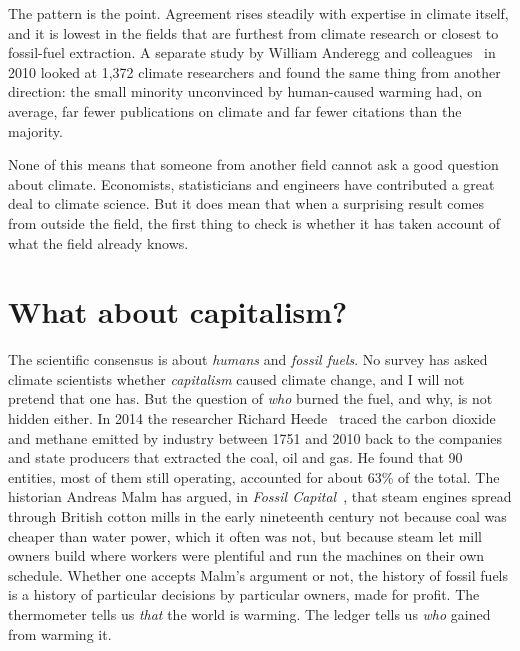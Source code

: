 The pattern is the point. Agreement rises steadily with expertise in climate itself, and it is lowest in the fields that are furthest from climate research or closest to fossil-fuel extraction. A separate study by William Anderegg and colleagues~\citep{anderegg2010} in 2010 looked at 1,372 climate researchers and found the same thing from another direction: the small minority unconvinced by human-caused warming had, on average, far fewer publications on climate and far fewer citations than the majority.

None of this means that someone from another field cannot ask a good question about climate. Economists, statisticians and engineers have contributed a great deal to climate science. But it does mean that when a surprising result comes from outside the field, the first thing to check is whether it has taken account of what the field already knows.

\section{What about capitalism?}

The scientific consensus is about \emph{humans} and \emph{fossil fuels}. No survey has asked climate scientists whether \emph{capitalism} caused climate change, and I will not pretend that one has. But the question of \emph{who} burned the fuel, and why, is not hidden either. In 2014 the researcher Richard Heede~\citep{heede2014} traced the carbon dioxide and methane emitted by industry between 1751 and 2010 back to the companies and state producers that extracted the coal, oil and gas. He found that 90 entities, most of them still operating, accounted for about 63\% of the total. The historian Andreas Malm has argued, in \emph{Fossil Capital}~\citep{malm2016}, that steam engines spread through British cotton mills in the early nineteenth century not because coal was cheaper than water power, which it often was not, but because steam let mill owners build where workers were plentiful and run the machines on their own schedule. Whether one accepts Malm's argument or not, the history of fossil fuels is a history of particular decisions by particular owners, made for profit. The thermometer tells us \emph{that} the world is warming. The ledger tells us \emph{who} gained from warming it.
